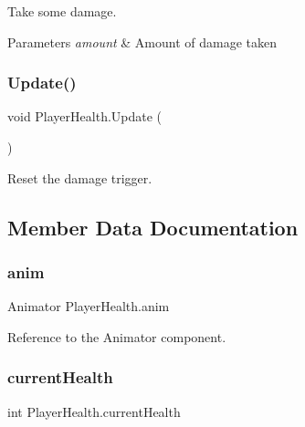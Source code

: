 Take some damage. 


\begin{DoxyParams}{Parameters}
{\em amount} & Amount of damage taken \\
\hline
\end{DoxyParams}
\mbox{\label{class_player_health_a3c49fdd702b2cf0fca654ef6e502f311}} 
\subsubsection{\texorpdfstring{Update()}{Update()}}
{\footnotesize\ttfamily void Player\+Health.\+Update (\begin{DoxyParamCaption}{ }\end{DoxyParamCaption})\hspace{0.3cm}{\ttfamily [private]}}



Reset the damage trigger. 



\subsection{Member Data Documentation}
\mbox{\label{class_player_health_aa3be907a776e00d9770e8dec377d2de3}} 
\subsubsection{\texorpdfstring{anim}{anim}}
{\footnotesize\ttfamily Animator Player\+Health.\+anim\hspace{0.3cm}{\ttfamily [private]}}

Reference to the Animator component. \mbox{\label{class_player_health_ac824ef20d43c0489bae436f3b25c1683}} 
\subsubsection{\texorpdfstring{currentHealth}{currentHealth}}
{\footnotesize\ttfamily int Player\+Health.\+current\+Health}

